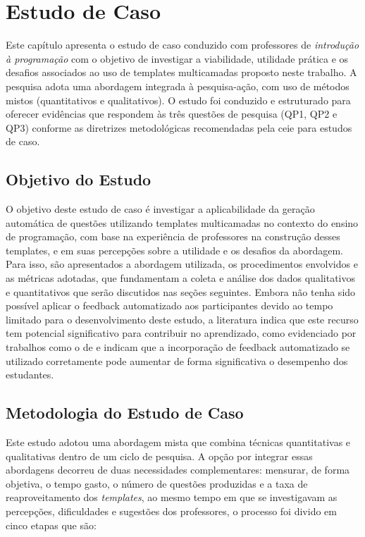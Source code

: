 \chapter{Estudo de Caso}

Este capítulo apresenta o estudo de caso conduzido com professores de \textit{introdução à programação} com o objetivo de investigar a viabilidade, utilidade prática e os desafios associados ao uso de templates multicamadas proposto neste trabalho. A pesquisa adota uma abordagem integrada à pesquisa-ação, com uso de métodos mistos (quantitativos e qualitativos). O estudo foi conduzido e estruturado para oferecer evidências que respondem às três questões de pesquisa (QP1, QP2 e QP3) conforme as diretrizes metodológicas recomendadas pela \gls{ceie} para estudos de caso.

\section{Objetivo do Estudo}
O objetivo deste estudo de caso é investigar a aplicabilidade da geração automática de questões utilizando templates multicamadas no contexto do ensino de programação, com base na experiência de professores na construção desses templates, e em suas percepções sobre a utilidade e os desafios da abordagem. Para isso, são apresentados a abordagem utilizada,  os procedimentos envolvidos e as métricas adotadas, que fundamentam a coleta e análise dos dados qualitativos e quantitativos que serão discutidos nas seções seguintes.
Embora não tenha sido possível aplicar o feedback automatizado aos participantes devido ao tempo limitado para o desenvolvimento deste estudo, a literatura  indica que este recurso tem potencial significativo para contribuir no aprendizado, como evidenciado por trabalhos como o de \parencite{vanpraet2024} e \parencite{fung2024} indicam que a incorporação de feedback automatizado se utilizado corretamente pode aumentar de forma significativa o desempenho dos estudantes.

\section{Metodologia do Estudo de Caso}

Este estudo adotou uma abordagem mista que combina técnicas quantitativas e qualitativas dentro de um ciclo de pesquisa. A opção por integrar essas abordagens decorreu de duas necessidades complementares: mensurar, de forma objetiva, o tempo gasto, o número de questões produzidas e a taxa de reaproveitamento dos \textit{templates}, ao mesmo tempo em que se investigavam as percepções, dificuldades e sugestões dos professores, o processo foi divido em cinco etapas que são:  

